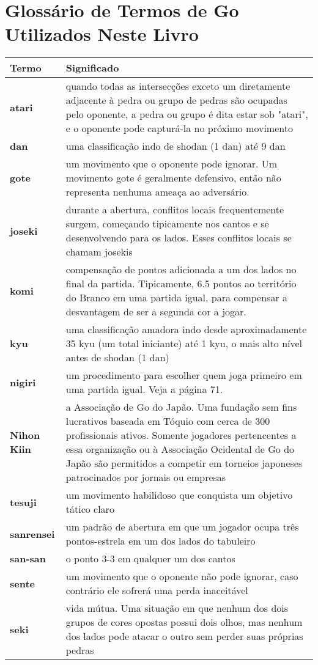 \chapter{Glossário de Termos de Go Utilizados Neste Livro}

\begin{longtable}{l|p{100mm}} 
 \hline
 \textbf{Termo} & \textbf{Significado} \\
 \hline \hline
 \textbf{atari} & quando todas as intersecções exceto um diretamente adjacente à pedra ou grupo de pedras são ocupadas pelo oponente, a pedra ou grupo é dita estar sob "atari", e o oponente pode capturá-la no próximo movimento \\ 
 \hline
 \textbf{dan} & uma classificação indo de shodan (1 dan) até 9 dan \\
 \hline
 \textbf{gote} & um movimento que o oponente pode ignorar. Um movimento gote é geralmente defensivo, então não representa nenhuma ameaça ao adversário. \\
 \hline
 \textbf{joseki} & durante a abertura, conflitos locais frequentemente surgem, começando tipicamente nos cantos e se desenvolvendo para os lados. Esses conflitos locais se chamam josekis \\
 \hline
 \textbf{komi} & compensação de pontos adicionada a um dos lados no final da partida. Tipicamente, 6.5 pontos ao território do Branco em uma partida igual, para compensar a desvantagem de ser a segunda cor a jogar. \\
 \hline
 \textbf{kyu} & uma classificação amadora indo desde aproximadamente 35 kyu (um total iniciante) até 1 kyu, o mais alto nível antes de shodan (1 dan) \\
 \hline
 \textbf{nigiri} & um procedimento para escolher quem joga primeiro em uma partida igual. Veja a página 71. \\
 \hline
 \textbf{Nihon Kiin} & a Associação de Go do Japão. Uma fundação sem fins lucrativos baseada em Tóquio com cerca de 300 profissionais ativos. Somente jogadores pertencentes a essa organização ou à Associação Ocidental de Go do Japão são permitidos a competir em torneios japoneses patrocinados por jornais ou empresas \\
 \hline
 \textbf{tesuji} & um movimento habilidoso que conquista um objetivo tático claro \\
 \hline
 \textbf{sanrensei} & um padrão de abertura em que um jogador ocupa três pontos-estrela em um dos lados do tabuleiro \\
 \hline
 \textbf{san-san} & o ponto 3-3 em qualquer um dos cantos \\
 \hline
 \textbf{sente} & um movimento que o oponente não pode ignorar, caso contrário ele sofrerá uma perda inaceitável \\
 \hline
 \textbf{seki} & vida mútua. Uma situação em que nenhum dos dois grupos de cores opostas possui dois olhos, mas nenhum dos lados pode atacar o outro sem perder suas próprias pedras \\
 \hline
\end{longtable}